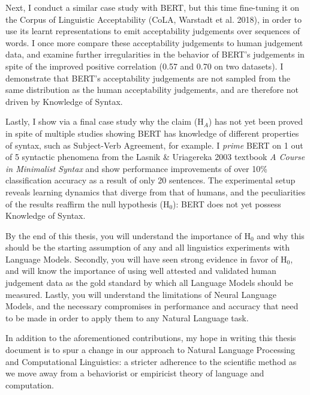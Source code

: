 Next, I conduct a similar case study with BERT, but this time fine-tuning it on the Corpus of Linguistic Acceptability (CoLA, Warstadt et al. 2018), in order to use its learnt representations to emit acceptability judgements over sequences of words.  I once more compare these acceptability judgements to human judgement data, and examine further irregularities in the behavior of BERT's judgements in spite of the improved positive correlation (0.57 and 0.70 on two datasets).  I demonstrate that BERT's acceptability judgements are not sampled from the same distribution as the human acceptability judgements, and are therefore not driven by Knowledge of Syntax.

Lastly, I show via a final case study why the claim ($\mathrm{H}_A$) has not yet been proved in spite of multiple studies showing BERT has knowledge of different properties of syntax, such as Subject-Verb Agreement, for example.  I \textit{prime} BERT on 1 out of 5 syntactic phenomena from the Lasnik & Uriagereka 2003 textbook \textit{A Course in Minimalist Syntax} and show performance improvements of over 10\% classification accuracy as a result of only 20 sentences.  The experimental setup reveals learning dynamics that diverge from that of humans, and the peculiarities of the results reaffirm the null hypothesis ($\mathrm{H}_0$): BERT does not yet possess Knowledge of Syntax.

By the end of this thesis, you will understand the importance of $\mathrm{H}_0$ and why this should be the starting assumption of any and all linguistics experiments with Language Models.  Secondly, you will have seen strong evidence in favor of $\mathrm{H}_0$, and will know the importance of using well attested and validated human judgement data as the gold standard by which all Language Models should be measured.  Lastly, you will understand the limitations of Neural Language Models, and the necessary compromises in performance and accuracy that need to be made in order to apply them to any Natural Language task.

In addition to the aforementioned contributions, my hope in writing this thesis document is to spur a change in our approach to Natural Language Processing and Computational Linguistics: a stricter adherence to the scientific method as we move away from a behaviorist or empiricist theory of language and computation.